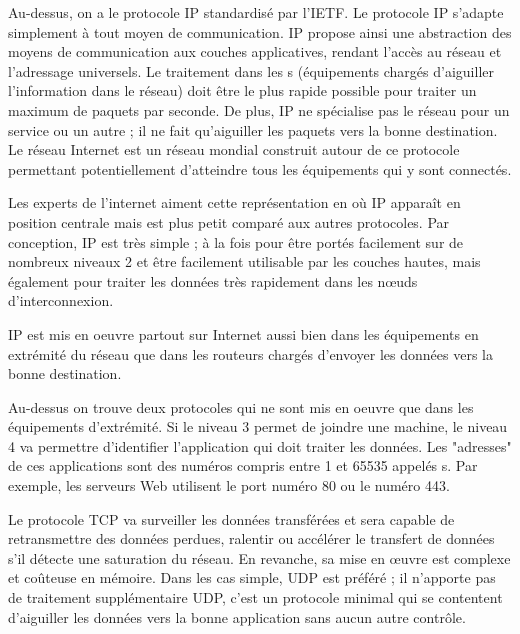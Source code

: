   
    \vspace{1em}

  
  
  Au-dessus, on a le protocole \ac{IP} standardisé par l'IETF.  Le protocole \ac{IP} s’adapte simplement à tout moyen de communication. \ac{IP} propose ainsi une abstraction des moyens de communication aux couches applicatives, rendant l’accès au réseau et l’adressage universels. Le traitement dans les s (équipements chargés d’aiguiller l’information dans le réseau) doit être le plus rapide possible pour traiter un maximum de paquets par seconde. De plus, \ac{IP} ne spécialise pas le réseau pour un service ou un autre ; il ne fait qu’aiguiller les paquets vers la bonne destination. Le réseau Internet est un réseau mondial construit autour de ce protocole permettant potentiellement d'atteindre tous les équipements qui y sont connectés. 
  
  
  Les experts de l'internet aiment cette représentation en  où \ac{IP} apparaît en position centrale mais est plus petit comparé aux autres protocoles. Par conception, \ac{IP} est très simple ; à la fois pour être portés facilement sur de nombreux niveaux 2 et être facilement utilisable par les couches hautes, mais également pour traiter les données très rapidement dans les nœuds d'interconnexion. 
  
  \ac{IP} est mis en oeuvre partout sur Internet aussi bien dans les équipements en extrémité du réseau que dans les routeurs chargés d'envoyer les données vers la bonne destination.
  
  
    \vspace{1em}

  Au-dessus on trouve deux protocoles qui ne sont mis en oeuvre que dans les équipements d'extrémité.  Si le niveau 3 permet de joindre une machine, le niveau 4 va permettre d’identifier l'application qui doit traiter les données. Les "adresses" de ces applications sont des numéros compris entre 1 et 65535 appelés s. Par exemple, les serveurs Web utilisent le port numéro 80 ou le numéro 443. 
  
  
  Le protocole \ac{TCP} va surveiller les données transférées et sera capable de retransmettre des données perdues, ralentir ou accélérer le transfert de données s’il détecte une saturation du réseau. En revanche, sa mise en œuvre est complexe et coûteuse en mémoire. Dans les cas simple, \ac{UDP} est préféré ; il n'apporte pas de traitement supplémentaire \ac{UDP}, c'est un protocole minimal qui se contentent d'aiguiller les données vers la bonne application sans aucun autre contrôle.
  

